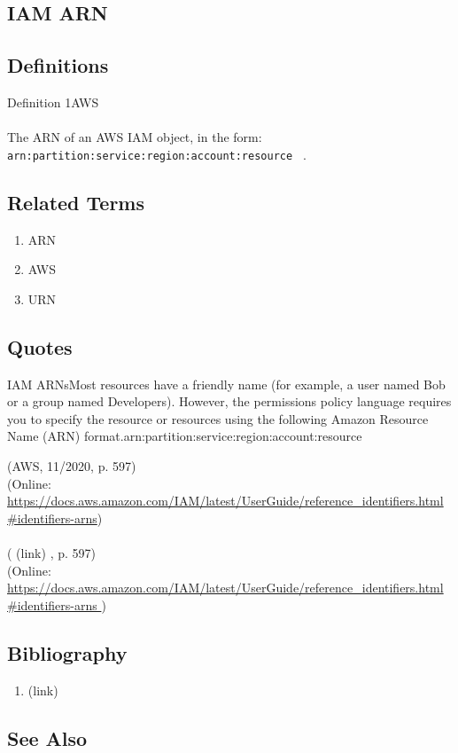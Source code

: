 \newpage \subsection*{IAM ARN } \subsection*{Definitions } \begin{DIC_Def}{Definition 1AWS }{} \paragraph{} The ARN of an AWS IAM object, in the form:  \texttt{ arn:partition:service:region:account:resource  } .  \end{DIC_Def} \subsection*{Related Terms } \begin{enumerate} \item  ARN  \item  AWS  \item  URN  \end{enumerate} \subsection*{Quotes } \begin{DIC_BlockQuote} IAM ARNsMost resources have a friendly name (for example, a user named Bob or a group named Developers). However, the permissions policy language requires you to specify the resource or resources using the following Amazon Resource Name (ARN) format.arn:partition:service:region:account:resource  \end{DIC_BlockQuote} (AWS, 11/2020, p. 597)\\ (Online: \url{https://docs.aws.amazon.com/IAM/latest/UserGuide/reference_identifiers.html\#identifiers-arns})  \paragraph{} (  (link) \href{AWS, 11/2020 }{ } , p. 597)  \\  (Online:  \href{None }{https://docs.aws.amazon.com/IAM/latest/UserGuide/reference\_identifiers.html\#identifiers-arns } )  \subsection*{Bibliography } \begin{enumerate} \item  (link) \href{AWS, 11/2020 }{ }   \end{enumerate} \subsection*{See Also } 